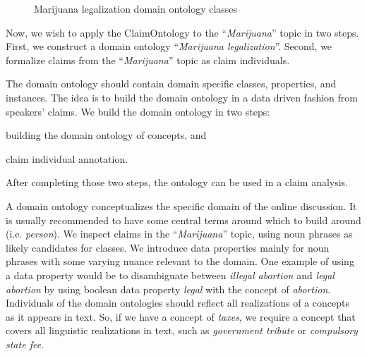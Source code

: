 \begin{figure}
	\centering
{}
\caption{Marijuana legalization domain ontology classes}
\label{fig:marijuana_domain_ontology}
\end{figure}


Now, we wish to apply the ClaimOntology to the ``\emph{Marijuana}'' topic in
two steps.  First, we construct a domain ontology ``\emph{Marijuana
legalization}''.  Second, we formalize claims from the ``\emph{Marijuana}''
topic as claim individuals. 

The domain ontology should contain domain specific classes, properties, and
instances. The idea is to build the domain ontology in a data driven 
fashion from speakers' claims. We build the domain ontology in two steps:
\begin{enumerate*}[label=(\arabic*)]
\item building the domain ontology of concepts, and 
\item claim individual annotation. 
\end{enumerate*}
After completing those two steps, the ontology can be used in a claim analysis. 

A domain ontology conceptualizes the specific domain of the online discussion. 
It is usually recommended to have some central terms around which to build
around (i.e. \emph{person}). We inspect claims in the ``\emph{Marijuana}'' topic,
using noun phrases as likely candidates for classes. We introduce
data properties mainly for noun phrases with some varying nuance relevant to
the domain. One example of using a data property would be to disambiguate between
\emph{illegal abortion} and \emph{legal abortion} by using boolean data
property \emph{legal} with the concept of \emph{abortion}.
Individuals of the domain ontologies should reflect all realizations of a concepts as
it appears in text. So, if we have a concept of \emph{taxes}, we require a concept
that covers all linguistic realizations in text, such as \emph{government tribute} or
\emph{compulsory state fee}. 

